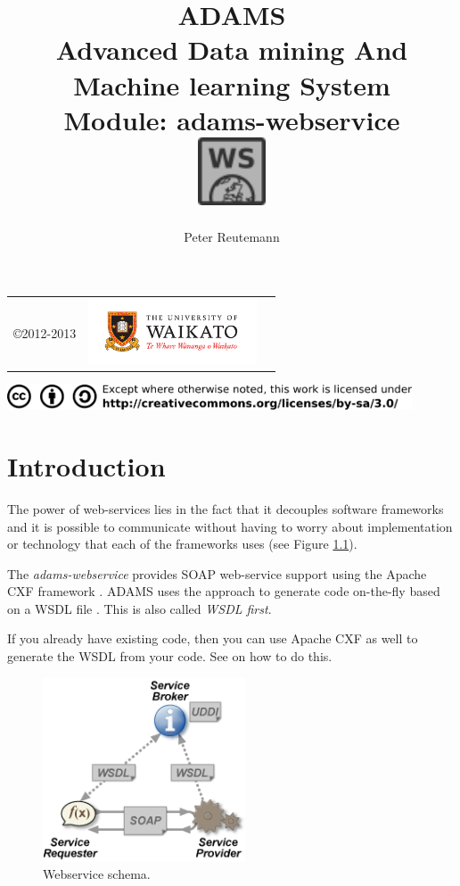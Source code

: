\documentclass[a4paper]{book}
\title{
  \textbf{ADAMS} \\
  {\Large \textbf{A}dvanced \textbf{D}ata mining \textbf{A}nd \textbf{M}achine
  learning \textbf{S}ystem} \\
  {\Large Module: adams-webservice} \\
  \vspace{1cm}
  \includegraphics[width=2cm]{images/webservice-module.png} \\
}
\author{
  Peter Reutemann
}
\begin{document}
\begin{titlepage}
\maketitle

\thispagestyle{empty}
\center
\begin{table}[b]
	\begin{tabular}{c l l}
		\parbox[c][2cm]{2cm}{\copyright 2012-2013} &
		\parbox[c][2cm]{5cm}{\includegraphics[width=5cm]{images/coat_of_arms.pdf}} \\
	\end{tabular}
	\includegraphics[width=12cm]{images/cc.png} \\
\end{table}

\end{titlepage}

\tableofcontents
\listoffigures

\chapter{Introduction}
The power of web-services \cite{webservice} lies in the fact that it decouples
software frameworks and it is possible to communicate without having to worry
about implementation or technology that each of the frameworks uses (see 
Figure \ref{webservices}). 

The \textit{adams-webservice} provides SOAP \cite{soap} web-service support using the Apache CXF
framework \cite{cxf}. ADAMS uses the approach to generate code on-the-fly based on a 
WSDL file \cite{wsdl}. This is also called \textit{WSDL first}.

If you already have existing code, then you can use Apache CXF as well to 
generate the WSDL from your code. See \cite{cxf-contract-first} on how to do
this.

\begin{figure}[htb]
  \centering
  \includegraphics[width=6.0cm]{images/webservices.png}
  \caption{Webservice schema.}
  \label{webservices}
\end{figure}
\end{document}
